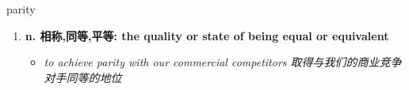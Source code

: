 
\begin{frame}
{\huge parity}
\begin{center}
\begin{enumerate}\Large
  \item \textbf{n. 相称,同等,平等: the quality or state of being equal or equivalent}
  \begin{itemize}
    \item \em{\Large{to achieve parity with our commercial competitors 取得与我们的商业竞争对手同等的地位}}
  \end{itemize}
\end{enumerate}
\end{center}
\end{frame}
